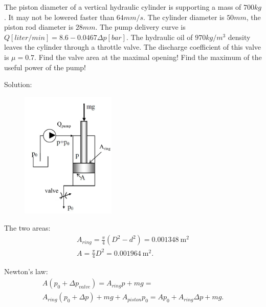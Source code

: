 
\vspace{1cm}

The piston diameter of a vertical hydraulic cylinder is supporting a mass of $700 kg$. It may not be lowered faster than $64 mm/s$. The cylinder diameter is $50 mm$, the piston rod diameter is $28 mm$. The pump delivery curve is $Q [liter/min] = 8.6-0.0467 \Delta p[bar]$. The hydraulic oil of $970 kg/m^3$ density leaves the cylinder through a throttle valve. The discharge coefficient of this valve is $\mu=0.7$. Find the valve area at the maximal opening! Find the maximum of the useful power of the pump! 

Solution:

\begin{figure}
\includegraphics[width=0.4\textwidth]{Problem_solving/figs/cylinder-problem.png}
\end{figure}

The two areas:
\begin{align*}
A_{ring} = \frac{\pi}{4} (D^2-d^2) = 0.001348~\mathrm{m^2}\\
A = \frac{\pi}{4} D^2 = 0.001964~\mathrm{m^2}.
\end{align*}

Newton's law:
\begin{multline*}
A(p_0+\Delta p_{valve}) = A_{ring}p + mg = \\
A_{ring}(p_0 + \Delta p) + mg + A_{piston}p_0 = Ap_0 + A_{ring} \Delta p + mg.
\end{multline*}

